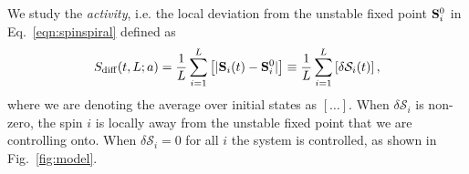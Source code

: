 \documentclass[twocolumn,amsmath,amssymb,floatfix,superscriptaddress,aps,prl]{revtex4-2}
\begin{document}
 


We study the {\it activity}, i.e. the local deviation from the unstable fixed point ${\bf S}_i^0$ in Eq.~\eqref{eqn:spinspiral} defined as
\begin{equation}
    S_{\mathrm{diff}}(t,L;a)= \frac{1}{L}\sum_{i=1}^L\left [|{\bf S}_i(t)-{\bf S}_i^0| \right ]\equiv \frac{1}{L}\sum_{i=1}^L\left [ \delta \mathcal{S}_i(t) \right ],
    \label{eq:Sdiff}
\end{equation}
where we are denoting the average over initial states as $[\dots ]$. 
%
When $\delta \mathcal{S}_i$ is non-zero, the spin $i$ is locally away %
from the unstable fixed point that we are controlling onto. When $\delta \mathcal{S}_i =0$ for all $i$ the system is controlled, as shown in Fig.~\ref{fig:model}.
\end{document}
